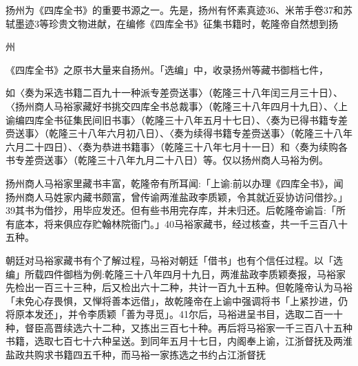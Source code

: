 扬州为《四库全书》的重要书源之一。先是，扬州有怀素真迹36、米芾手卷37和苏轼墨迹3等珍贵文物进献，在编修《四库全书》征集书籍时，乾隆帝自然想到扬

\vfill
\begin{BookNotes}
\end{BookNotes}

\noindent 州

\begin{BookQuote}
《四库全书》之原书大量来自扬州。「选编」中，收录扬州等藏书御档七件，
\end{BookQuote}

如〈奏为采选书籍二百九十一种派专差赍送事〉（乾隆三十八年闰三月三十日）、〈扬州商人马裕家藏好书挑交四库全书总裁事〉（乾隆三十八年四月十九日）、〈上谕编四库全书征集民间旧书事〉（乾隆三十八年五月十七日）、〈奏为已得书籍专差赍送事〉（乾隆三十八年六月初八日）、〈奏为续得书籍专差赍送事〉（乾隆三十八年六月二十四日）、〈奏为恭进书籍事〉（乾隆三十八年七月十一日）和〈奏为续购各书专差赍送事〉（乾隆三十八年九月二十八日）等。仅以扬州商人马裕为例。

扬州商人马裕家里藏书丰富，乾隆帝有所耳闻:「上谕:前以办理《四库全书》，闻扬州商人马姓家内藏书颇富，曾传谕两淮盐政李质颖，令其就近妥协访问借抄。」39其书为借抄，用毕应发还。但有些书用完存库，并未归还。后乾隆帝谕旨:「所有底本，将来俱应存贮翰林院衙门。」40马裕家藏书，经过核查，共一千三百八十五种。

朝廷对马裕家藏书有个了解过程，马裕对朝廷「借书」也有个信任过程。以「选编」所载四件御档为例:乾隆三十八年四月十九日，两淮盐政李质颖奏报，马裕家先检出一百三十三种，后又检出六十二种，共计一百九十五种。但乾隆帝认为马裕「未免心存畏惧，又惮将善本远借」，故乾隆帝在上谕中强调将书「上紧抄进，仍将原本发还」，并令李质颖「善为寻觅」。41尔后，马裕进呈书目，选取二百一十种，督臣高晋续选六十二种，又拣出三百七十种。再后将马裕家一千三百八十五种书籍，选取七百七十六种呈送。到同年五月十七日，内阁奉上谕，江浙督抚及两淮盐政共购求书籍四五千种，而马裕一家拣选之书约占江浙督抚

